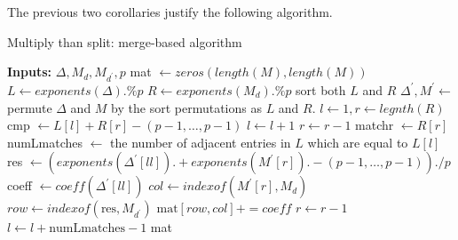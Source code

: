 The previous two corollaries justify
the following algorithm.

\begin{algorithm}
\caption{Multiply than split: merge-based algorithm}
\label{alg:theta:merge}
\begin{algorithmic}[1]
\State \textbf{Inputs:} \(\Delta, M_{d}, M_{d^{\prime}}, p\)
\State mat \(\gets zeros(length(M), length(M))\) 
\State \(L \gets exponents(\Delta) .\% p\) 
\State \(R \gets exponents(M_{d}) .\% p\)
\State sort both  \(L\) and \(R\) 
\State \(\Delta^{\prime}, M^{\prime} \gets \)permute \(\Delta\) and \(M\) by the sort permutations as \(L\) and \(R\).
\State \(l \gets 1, r \gets legnth(R)\)
	\State cmp \(\gets L[l] + R[r] - (p-1, \ldots, p-1)\) 
	    \State \(l \gets l + 1\) 
	    \State \(r \gets r - 1\)
        \State matchr \(\gets R[r]\) 
        \State numLmatches \(\gets\) the number of adjacent entries in \(L\) which are equal to \(L[l]\) 
                \State res \(\gets (exponents(\Delta^{\prime}[ll]) .+ exponents(M^{\prime}[r]) .- (p-1, \ldots, p-1)) ./ p\) 
                \State coeff \(\gets coeff(\Delta^{\prime}[ll])\)
                \State \(col \gets indexof(M^{\prime}[r],M_{d})\)
                \State \(row \gets indexof(\text{res},M_{d^{\prime}})\)
                \State \(\text{mat}[row,col] += coeff\) 
            \EndFor
            \State \(r \gets r - 1\)
        \EndWhile     
        \State \(l \gets l + \text{numLmatches} - 1\) 
    \EndIf
\EndWhile
\State \Return mat
\end{algorithmic}
\end{algorithm}

%
%
%
%
%
%
%
%
%
%

